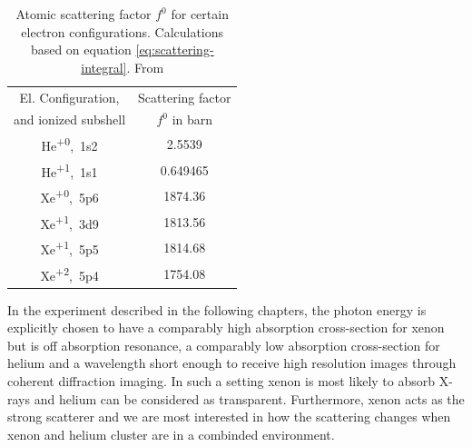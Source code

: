 \begin{table}
	\centering
		\begin{tabular}{ | c | c | }
		\hline
			El. Configuration, & Scattering factor \\
			and ionized subshell & $f^{0}$ in barn \\ \hline
			He\textsuperscript{+0},\ 1s2 & 2.5539  \\ \hline
			He\textsuperscript{+1},\ 1s1 & 0.649465  \\ \hline
			Xe\textsuperscript{+0},\ 5p6 & 1874.36  \\ \hline
			Xe\textsuperscript{+1},\ 3d9 & 1813.56  \\ \hline
			Xe\textsuperscript{+1},\ 5p5 & 1814.68  \\ \hline
			Xe\textsuperscript{+2},\ 5p4 & 1754.08  \\ \hline
		\end{tabular}
	\caption[Atomic scattering factors for helium and xenon.]{Atomic scattering factor $f^{0}$ for certain electron configurations. Calculations based on equation \eqref{eq:scattering-integral}. From \cite{Ho-2016-PC}}
	\label{tab:helium-xenon-el-scattering-crossection}
\end{table}
In the experiment described in the following chapters, the photon energy is explicitly chosen to have a comparably high absorption cross-section for xenon but is off absorption resonance, a comparably low absorption cross-section for helium and a wavelength short enough to receive high resolution images through coherent diffraction imaging. In such a setting xenon is most likely to absorb X-rays and helium can be considered as transparent. Furthermore, xenon acts as the strong scatterer and we are most interested in how the scattering changes when xenon and helium cluster are in a combinded environment.
%
%
%
%
%
